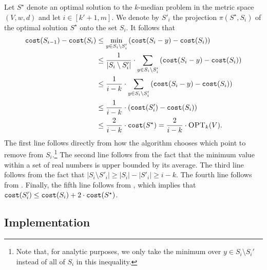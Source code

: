 \documentclass[11pt]{article}
\newcommand{\1}{\mathmybb{1}}
\newcommand{\proj}{\pi}
\newcommand{\OPT}{\textsc{OPT}}
\newcommand{\cost}{\textnormal{\texttt{cost}}}
\begin{document}
Let $S^\star$ denote an optimal solution to the $k$-median problem in the metric space $(V,w,d)$ and let $i \in [k' + 1, m]$. We denote by $S'_i$ the projection $\proj(S^\star, S_i)$ of the optimal solution $S^\star$ onto the set $S_i$. It follows that
\begin{align*}
    \cost(S_{i-1}) - \cost(S_i) &\leq \min_{y \in S_i \setminus S'_i} \left(\cost(S_i - y) - \cost(S_i) \right)\\
    &\leq \frac{1}{|S_i \setminus S'_i|} \cdot \sum_{y \in S_i \setminus S'_i} \left(\cost(S_i - y) - \cost(S_i) \right)\\
    &\leq \frac{1}{i - k} \cdot \sum_{y \in S_i \setminus S'_i} \left(\cost(S_i - y) - \cost(S_i) \right)\\
    &\leq \frac{1}{i - k} \cdot \left(\cost(S'_i) - \cost(S_i) \right)\\
    &\leq \frac{2}{i - k} \cdot \cost(S^\star) = \frac{2}{i - k} \cdot \OPT_k(V).
\end{align*}
The first line follows directly from how the algorithm chooses which point to remove from $S_i$.\footnote{Note that, for analytic purposes, we only take the minimum over $y \in S_i \setminus S_i'$ instead of all of $S_i$ in this inequality.} The second line follows from the fact that the minimum value within a set of real numbers is upper bounded by its average. The third line follows from the fact that $|S_i \setminus S'_i| \geq |S_i| - |S'_i| \geq i - k$. 
The fourth line follows from .
Finally, the fifth line follows from , which implies that $\cost(S'_i) \leq \cost(S_i) + 2\cdot \cost(S^\star)$.

\subsection{Implementation}
\end{document}
